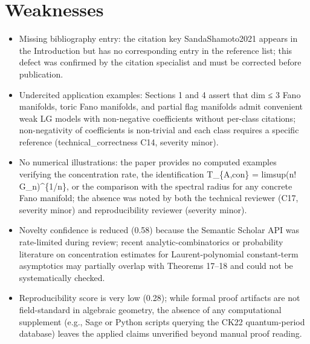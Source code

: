 \documentclass[11pt]{article}
\begin{document}
\section*{Weaknesses}
\begin{itemize}[leftmargin=*]
  \item Missing bibliography entry: the citation key SandaShamoto2021 appears in the Introduction but has no corresponding entry in the reference list; this defect was confirmed by the citation specialist and must be corrected before publication.
  \item Undercited application examples: Sections 1 and 4 assert that dim ≤ 3 Fano manifolds, toric Fano manifolds, and partial flag manifolds admit convenient weak LG models with non-negative coefficients without per-class citations; non-negativity of coefficients is non-trivial and each class requires a specific reference (technical\_correctness C14, severity minor).
  \item No numerical illustrations: the paper provides no computed examples verifying the concentration rate, the identification T\_\{A,con\} = limsup(n! G\_n)\^{}\{1/n\}, or the comparison with the spectral radius for any concrete Fano manifold; the absence was noted by both the technical reviewer (C17, severity minor) and reproducibility reviewer (severity minor).
  \item Novelty confidence is reduced (0.58) because the Semantic Scholar API was rate-limited during review; recent analytic-combinatorics or probability literature on concentration estimates for Laurent-polynomial constant-term asymptotics may partially overlap with Theorems 17–18 and could not be systematically checked.
  \item Reproducibility score is very low (0.28); while formal proof artifacts are not field-standard in algebraic geometry, the absence of any computational supplement (e.g., Sage or Python scripts querying the CK22 quantum-period database) leaves the applied claims unverified beyond manual proof reading.
\end{itemize}
\end{document}
